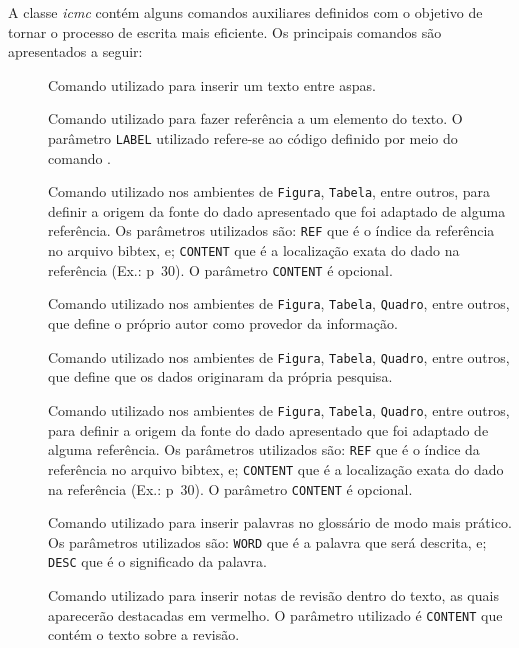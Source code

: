 A classe \textit{icmc} contém alguns comandos auxiliares definidos com o objetivo de tornar o processo de escrita mais eficiente. Os principais comandos são apresentados a seguir:

\begin{description}
    
    \item[] Comando utilizado para inserir um texto entre aspas.
    \item[] Comando utilizado para fazer referência a um elemento do texto. O parâmetro \texttt{LABEL} utilizado refere-se ao código definido por meio do comando .
    \item[] Comando utilizado nos ambientes de \texttt{Figura}, \texttt{Tabela}, entre outros, para definir a origem da fonte do dado apresentado que foi adaptado de alguma referência. Os parâmetros utilizados são: \texttt{REF} que é o índice da referência no arquivo bibtex, e; \texttt{CONTENT} que é a localização exata do dado na referência (Ex.: p~30). O parâmetro \texttt{CONTENT} é opcional.
    \item[] Comando utilizado nos ambientes de \texttt{Figura}, \texttt{Tabela}, \texttt{Quadro}, entre outros, que define o próprio autor como provedor da informação.
    \item[] Comando utilizado nos ambientes de \texttt{Figura}, \texttt{Tabela}, \texttt{Quadro}, entre outros, que define que os dados originaram da própria pesquisa.
    \item[] Comando utilizado nos ambientes de \texttt{Figura}, \texttt{Tabela}, \texttt{Quadro}, entre outros, para definir a origem da fonte do dado apresentado que foi adaptado de alguma referência. Os parâmetros utilizados são: \texttt{REF} que é o índice da referência no arquivo bibtex, e; \texttt{CONTENT} que é a localização exata do dado na referência (Ex.: p~30). O parâmetro \texttt{CONTENT} é opcional.
    \item[] Comando utilizado para inserir palavras no glossário de modo mais prático. Os parâmetros utilizados são: \texttt{WORD} que é a palavra que será descrita, e; \texttt{DESC} que é o significado da palavra.
    \item[] Comando utilizado para inserir notas de revisão dentro do texto, as quais aparecerão destacadas em vermelho. O parâmetro utilizado é \texttt{CONTENT} que contém o texto sobre a revisão.

\end{description}
